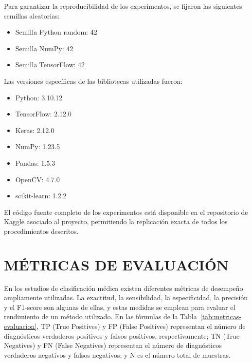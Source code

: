 Para garantizar la reproducibilidad de los experimentos, se fijaron las siguientes 
semillas aleatorias:

\begin{itemize}
    \item Semilla Python random: 42
    \item Semilla NumPy: 42
    \item Semilla TensorFlow: 42
\end{itemize}

Las versiones específicas de las bibliotecas utilizadas fueron:
\begin{itemize}
    \item Python: 3.10.12
    \item TensorFlow: 2.12.0
    \item Keras: 2.12.0
    \item NumPy: 1.23.5
    \item Pandas: 1.5.3
    \item OpenCV: 4.7.0
    \item scikit-learn: 1.2.2
\end{itemize}

El código fuente completo de los experimentos está disponible en el repositorio de Kaggle 
asociado al proyecto, permitiendo la replicación exacta de todos los procedimientos 
descritos.

\section{MÉTRICAS DE EVALUACIÓN} \label{sec:metricas-evaluacion}

En los estudios de clasificación médica existen diferentes métricas de desempeño
ampliamente utilizadas. La exactitud, la sensibilidad, la especificidad, la precisión y
el F1-score son algunas de ellas, y estas medidas se emplean para evaluar el rendimiento
de un método utilizado. En las fórmulas de la Tabla~\ref{tab:metricas-evaluacion}, TP
(True Positives) y FP (False Positives) representan el número de diagnósticos
verdaderos positivos y falsos positivos, respectivamente; TN (True Negatives) y FN
(False Negatives) representan el número de diagnósticos verdaderos negativos y falsos
negativos; y N es el número total de muestras.

